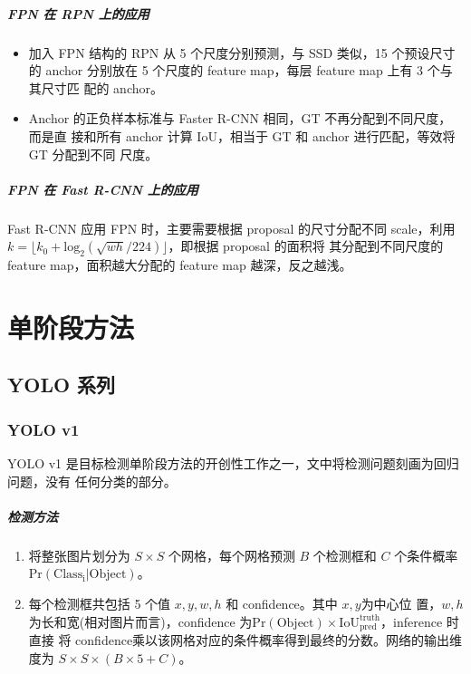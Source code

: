 \paragraph{FPN 在 RPN 上的应用}

\begin{itemize}
  \item 加入 FPN 结构的 RPN 从 5 个尺度分别预测，与 SSD 类似，15 个预设尺寸的
    anchor 分别放在 5 个尺度的 feature map，每层 feature map 上有 3 个与其尺寸匹
    配的 anchor。
  \item Anchor 的正负样本标准与 Faster R-CNN 相同，GT 不再分配到不同尺度，而是直
    接和所有 anchor 计算 IoU，相当于 GT 和 anchor 进行匹配，等效将 GT 分配到不同
    尺度。
\end{itemize}

\paragraph{FPN 在 Fast R-CNN 上的应用}

Fast R-CNN 应用 FPN 时，主要需要根据 proposal 的尺寸分配不同 scale，利用 $ k =
\lfloor k_0 + \mathrm{log}_2 ( \sqrt{wh}/224 ) \rfloor$，即根据 proposal 的面积将
其分配到不同尺度的 feature map，面积越大分配的 feature map 越深，反之越浅。

\chapter{单阶段方法}

\section{YOLO 系列}
\label{sec:YOLO}

\subsection{YOLO v1}
\label{subsec:YOLOv1}
YOLO v1 是目标检测单阶段方法的开创性工作之一，文中将检测问题刻画为回归问题，没有
任何分类的部分。

\paragraph{检测方法}

\begin{enumerate}
  \item 将整张图片划分为 $S \times S$ 个网格，每个网格预测 $ B $ 个检测框和 $ C $
  个条件概率 $ \mathrm{Pr}(\mathrm{Class_i}|\mathrm{Object}) $。
  \item 每个检测框共包括 5 个值 $x, y, w, h$ 和 confidence。其中 $x, y$为中心位
  置，$w, h$ 为长和宽(相对图片而言)，confidence 为$\mathrm{Pr}(\mathrm{Object})
  \times \mathrm{IoU}^{\mathrm{truth}}_{\mathrm{pred}}$，inference 时直接
  将 confidence乘以该网格对应的条件概率得到最终的分数。网络的输出维度为 $ S
  \times S \times (B \times 5 + C) $。
\end{enumerate}

